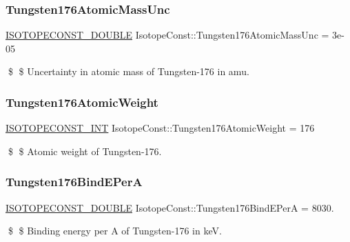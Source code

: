 \subsubsection{\texorpdfstring{Tungsten176\+Atomic\+Mass\+Unc}{Tungsten176AtomicMassUnc}}
{\footnotesize\ttfamily \mbox{\hyperlink{group___isotope_const-_macros_ga8f45a7272ce02c0b4c65c44636ed719a}{I\+S\+O\+T\+O\+P\+E\+C\+O\+N\+S\+T\+\_\+\+D\+O\+U\+B\+LE}} Isotope\+Const\+::\+Tungsten176\+Atomic\+Mass\+Unc = 3e-\/05}

\$ \$ Uncertainty in atomic mass of Tungsten-\/176 in amu. \mbox{\label{group___isotope_const-_tungsten-_w176_gaa8b58782034ccd0985fbb2cecd536e9e}} 
\subsubsection{\texorpdfstring{Tungsten176\+Atomic\+Weight}{Tungsten176AtomicWeight}}
{\footnotesize\ttfamily \mbox{\hyperlink{group___isotope_const-_macros_ga5f18360b3e99483a35c32d789e62621c}{I\+S\+O\+T\+O\+P\+E\+C\+O\+N\+S\+T\+\_\+\+I\+NT}} Isotope\+Const\+::\+Tungsten176\+Atomic\+Weight = 176}

\$ \$ Atomic weight of Tungsten-\/176. \mbox{\label{group___isotope_const-_tungsten-_w176_ga437b067b39a6f3c20471c2ef1839315e}} 
\subsubsection{\texorpdfstring{Tungsten176\+Bind\+E\+PerA}{Tungsten176BindEPerA}}
{\footnotesize\ttfamily \mbox{\hyperlink{group___isotope_const-_macros_ga8f45a7272ce02c0b4c65c44636ed719a}{I\+S\+O\+T\+O\+P\+E\+C\+O\+N\+S\+T\+\_\+\+D\+O\+U\+B\+LE}} Isotope\+Const\+::\+Tungsten176\+Bind\+E\+PerA = 8030.}

\$ \$ Binding energy per A of Tungsten-\/176 in keV. \mbox{\label{group___isotope_const-_tungsten-_w176_ga2a277ec7ed4c2f0e260b77f3d0119e63}} 
